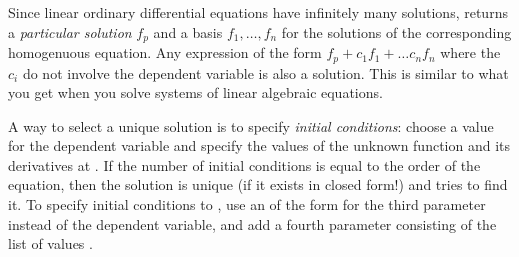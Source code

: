 {{{{{{{{{{{{{{{{\begin{xtc}
\begin{TeXOutput}
\begin{fricasmath}{3}
%
\end{fricasmath}
\end{TeXOutput}
\end{xtc}
%
Since linear ordinary differential equations have infinitely many
solutions,  returns a {\it particular solution}
$f_p$
and a basis
$f_1,\dots,f_n$
for the solutions of the corresponding homogenuous equation.
Any expression of the form
$f_p + c_1 f_1 + \dots c_n f_n$
where the $c_i$ do not involve
the dependent variable is also a solution.
This is similar to what you get when you solve systems of linear
algebraic equations.

A way to select a unique solution is to specify {\it initial
conditions}: choose a value  for the dependent variable
and specify the values of the unknown function and its derivatives
at .
If the number of initial conditions is equal to the order of the
equation, then the solution is unique (if it exists in closed
form!) and  tries to find it.
To specify initial conditions to , use an
 of the form  for the third
parameter instead of the dependent variable, and add a fourth
parameter consisting of the list of values .

}}}}}}}}}}}}}}}}

